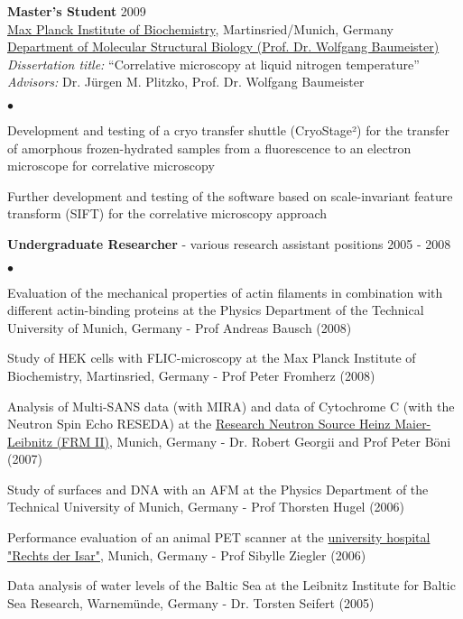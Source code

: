 \documentclass[margin,line]{res}
\newenvironment{list2}{
  \begin{list}{$\bullet$}{%
      \setlength{\itemsep}{0in}
      \setlength{\parsep}{0in} \setlength{\parskip}{0in}
      \setlength{\topsep}{0in} \setlength{\partopsep}{0in} 
      \setlength{\leftmargin}{0.2in}}}{\end{list}}
\begin{document}
\begin{resume}
\vspace*{-1mm}
{\bf Master's Student} \hfill {2009}\\
\href{https://www.biochem.mpg.de/en}{Max Planck Institute of Biochemistry}, Martinsried/Munich, Germany\\
\href{https://www.biochem.mpg.de/baumeister}{Department of Molecular Structural Biology (Prof. Dr. Wolfgang Baumeister)}\\
{\it Dissertation title:} “Correlative microscopy at liquid nitrogen temperature”\\
{\it Advisors:} Dr. Jürgen M. Plitzko, Prof. Dr. Wolfgang Baumeister\\
\vspace*{-3mm}
\begin{list2}
\vspace*{-1mm}
\item Development and testing of a cryo transfer shuttle (CryoStage²) for the transfer of amorphous frozen-hydrated samples from a fluorescence to an electron microscope for correlative microscopy
\item Further development and testing of the software based on scale-invariant feature transform (SIFT) for the correlative microscopy approach
\end{list2}
\vspace*{-1mm}
{\bf Undergraduate Researcher} - various research assistant positions \hfill {2005 - 2008}\\
\vspace*{-3mm}
\begin{list2}
\vspace*{-1mm}
\item Evaluation of the mechanical properties of actin filaments in combination with different actin-binding proteins at the Physics Department of the Technical University of Munich, Germany - Prof Andreas Bausch (2008)
\item Study of HEK cells with FLIC-microscopy at the Max Planck Institute of Biochemistry, Martinsried, Germany - Prof Peter Fromherz (2008)
\item Analysis of Multi-SANS data (with MIRA) and data of Cytochrome C (with the Neutron Spin Echo RESEDA) at the  \href{https://www.frm2.tum.de/en/home/}{Research Neutron Source Heinz Maier-Leibnitz (FRM II)}, Munich, Germany - Dr. Robert Georgii and Prof Peter Böni (2007)
\item Study of surfaces and DNA with an AFM at the Physics Department of the Technical University of Munich, Germany - Prof Thorsten Hugel (2006)
\item Performance evaluation of an animal PET scanner at the  \href{https://www.mri.tum.de/}{university hospital "Rechts der Isar"}, Munich, Germany - Prof Sibylle Ziegler (2006)
\item Data analysis of water levels of the Baltic Sea at the Leibnitz Institute for Baltic Sea Research, Warnemünde, Germany - Dr. Torsten Seifert (2005)
\end{list2}


\end{resume}
\end{document}
